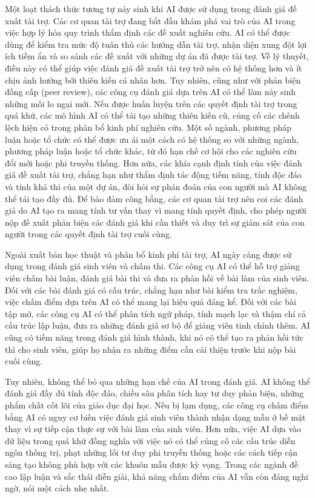 Một loạt thách thức tương tự nảy sinh khi AI được sử dụng trong đánh giá đề xuất tài trợ. Các cơ quan tài trợ đang bắt đầu khám phá vai trò của AI trong việc hợp lý hóa quy trình thẩm định các đề xuất nghiên cứu. AI có thể được dùng để kiểm tra mức độ tuân thủ các hướng dẫn tài trợ, nhận diện xung đột lợi ích tiềm ẩn và so sánh các đề xuất với những dự án đã được tài trợ. Về lý thuyết, điều này có thể giúp việc đánh giá đề xuất tài trợ trở nên có hệ thống hơn và ít chịu ảnh hưởng bởi thiên kiến cá nhân hơn. Tuy nhiên, cũng như với phản biện đồng cấp (peer review), các công cụ đánh giá dựa trên AI có thể làm nảy sinh những mối lo ngại mới. Nếu được huấn luyện trên các quyết định tài trợ trong quá khứ, các mô hình AI có thể tái tạo những thiên kiến cũ, củng cố các chênh lệch hiện có trong phân bổ kinh phí nghiên cứu. Một số ngành, phương pháp luận hoặc tổ chức có thể được ưu ái một cách có hệ thống so với những ngành, phương pháp luận hoặc tổ chức khác, từ đó hạn chế cơ hội cho các nghiên cứu đổi mới hoặc phi truyền thống. Hơn nữa, các khía cạnh định tính của việc đánh giá đề xuất tài trợ, chẳng hạn như thẩm định tác động tiềm năng, tính độc đáo và tính khả thi của một dự án, đòi hỏi sự phán đoán của con người mà AI không thể tái tạo đầy đủ. Để bảo đảm công bằng, các cơ quan tài trợ nên coi các đánh giá do AI tạo ra mang tính tư vấn thay vì mang tính quyết định, cho phép người nộp đề xuất phản biện các đánh giá khi cần thiết và duy trì sự giám sát của con người trong các quyết định tài trợ cuối cùng.

Ngoài xuất bản học thuật và phân bổ kinh phí tài trợ, AI ngày càng được sử dụng trong đánh giá sinh viên và chấm thi. Các công cụ AI có thể hỗ trợ giảng viên chấm bài luận, đánh giá bài thi và đưa ra phản hồi về bài làm của sinh viên. Đối với các bài đánh giá có cấu trúc, chẳng hạn như bài kiểm tra trắc nghiệm, việc chấm điểm dựa trên AI có thể mang lại hiệu quả đáng kể. Đối với các bài tập mở, các công cụ AI có thể phân tích ngữ pháp, tính mạch lạc và thậm chí cả cấu trúc lập luận, đưa ra những đánh giá sơ bộ để giảng viên tinh chỉnh thêm. AI cũng có tiềm năng trong đánh giá hình thành, khi nó có thể tạo ra phản hồi tức thì cho sinh viên, giúp họ nhận ra những điểm cần cải thiện trước khi nộp bài cuối cùng.

Tuy nhiên, không thể bỏ qua những hạn chế của AI trong đánh giá. AI không thể đánh giá đầy đủ tính độc đáo, chiều sâu phân tích hay tư duy phản biện, những phẩm chất cốt lõi của giáo dục đại học. Nếu bị lạm dụng, các công cụ chấm điểm bằng AI có nguy cơ biến việc đánh giá sinh viên thành nhận dạng mẫu ở bề mặt thay vì sự tiếp cận thực sự với bài làm của sinh viên. Hơn nữa, việc AI dựa vào dữ liệu trong quá khứ đồng nghĩa với việc nó có thể củng cố các cấu trúc diễn ngôn thống trị, phạt những lối tư duy phi truyền thống hoặc các cách tiếp cận sáng tạo không phù hợp với các khuôn mẫu được kỳ vọng. Trong các ngành đề cao lập luận và sắc thái diễn giải, khả năng chấm điểm của AI vẫn còn đáng nghi ngờ, nói một cách nhẹ nhất.


